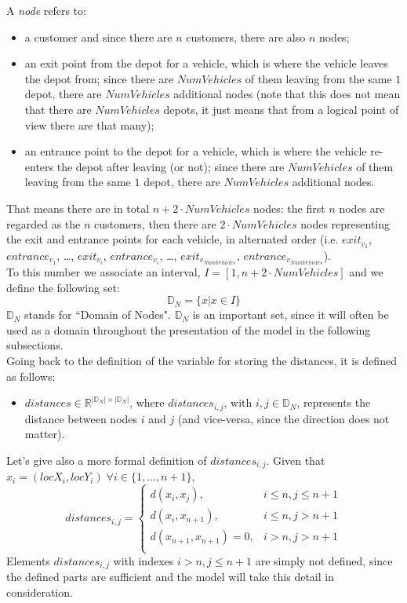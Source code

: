 \documentclass[../main.tex]{subfiles}
\begin{document}
A \textit{node} refers to:
\begin{itemize}
    \item a customer and since there are $n$ customers, there are also $n$ nodes;
    \item an exit point from the depot for a vehicle, which is where the vehicle leaves the depot from; since there are $NumVehicles$ of them leaving from the same $1$ depot, there are $NumVehicles$ additional nodes (note that this does not mean that there are $NumVehicles$ depots, it just means that from a logical point of view there are that many);
    \item an entrance point to the depot for a vehicle, which is where the vehicle re-enters the depot after leaving (or not); since there are $NumVehicles$ of them leaving from the same $1$ depot, there are $NumVehicles$ additional nodes.
\end{itemize}
That means there are in total $n + 2 \cdot NumVehicles$ nodes: the first $n$ nodes are regarded as the $n$ customers, then there are $2 \cdot NumVehicles$ nodes representing the exit and entrance points for each vehicle, in alternated order (i.e. $exit_{v_1}$, $entrance_{v_1}$, \dots, $exit_{v_i}$, $entrance_{v_i}$, \dots, $exit_{v_{NumVehicles}}$, $entrance_{v_{NumVehicles}}$).\\
To this number we associate an interval, $I = [1, n + 2 \cdot NumVehicles]$ and we define the following set: $$\mathbb{D}_N = \{x | x \in I\}$$
$\mathbb{D}_N$ stands for ``Domain of Nodes".
$\mathbb{D}_N$ is an important set, since it will often be used as a domain throughout the presentation of the model in the following subsections.\\
Going back to the definition of the variable for storing the distances, it is defined as follows:
\begin{itemize}
    \item $distances \in \mathbb{R}^{|\mathbb{D}_N|\times{}|\mathbb{D}_N|}$, where $distances_{i,j}$, with $i,j \in \mathbb{D}_N$, represents the distance between nodes $i$ and $j$ (and vice-versa, since the direction does not matter).
\end{itemize}
Let's give also a more formal definition of $distances_{i,j}$. Given that $x_i = (locX_i, locY_i) \; \forall i \in \{1,\dots,n+1\}$,
$$distances_{i,j} = {
    \begin{cases}
        d(x_i, x_j), & \text{$i \leq n, j \leq n+1$} \\
        d(x_i, x_{n+1}), & \text{$i \leq n, j > n+1$} \\
        d(x_{n+1}, x_{n+1}) = 0, & \text{$i > n, j > n+1$} \\
    \end{cases}
}$$
Elements $distances_{i,j}$ with indexes $i > n, j \leq n+1$ are simply not defined, since the defined parts are sufficient and the model will take this detail in consideration.
\end{document}
